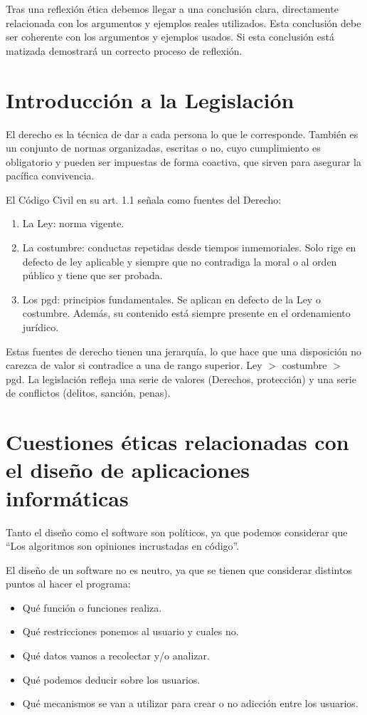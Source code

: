 Tras una reflexión ética debemos llegar a una conclusión clara, directamente relacionada con los argumentos y ejemplos reales utilizados. Esta conclusión debe ser coherente con los argumentos y ejemplos usados. Si esta conclusión está matizada demostrará un correcto proceso de reflexión.

\section{Introducción a la Legislación}
El derecho es la técnica de dar a cada persona lo que le corresponde. También es un conjunto de normas organizadas, escritas o no, cuyo cumplimiento es obligatorio y pueden ser impuestas de forma coactiva, que sirven para asegurar la pacífica convivencia.

El Código Civil en su art. 1.1 señala como fuentes del Derecho:
\begin{enumerate}
    \item La Ley: norma vigente.
    \item La costumbre: conductas repetidas desde tiempos inmemoriales. Solo rige en defecto de ley aplicable y siempre que no contradiga la moral o al orden público y tiene que ser probada.
    \item Los \gls{pgd}: principios fundamentales. Se aplican en defecto de la Ley o costumbre. Además, su contenido está siempre presente en el ordenamiento jurídico.
\end{enumerate}

Estas fuentes de derecho tienen una jerarquía, lo que hace que una disposición no carezca de valor si contradice a una de rango superior. Ley $>$ costumbre $>$ \gls{pgd}.
La legislación refleja una serie de valores (Derechos, protección) y una serie de conflictos (delitos, sanción, penas).
\section{Cuestiones éticas relacionadas con el diseño de aplicaciones informáticas}
Tanto el diseño como el software son políticos, ya que podemos considerar que ``Los algoritmos son opiniones incrustadas en código''.

El diseño de un software no es neutro, ya que se tienen que considerar distintos puntos al hacer el programa:
\begin{itemize}
    \item Qué función o funciones realiza.
    \item Qué restricciones ponemos al usuario y cuales no.
    \item Qué datos vamos a recolectar y/o analizar.
    \item Qué podemos deducir sobre los usuarios.
    \item Qué mecanismos se van a utilizar para crear o no adicción entre los usuarios.
\end{itemize}

